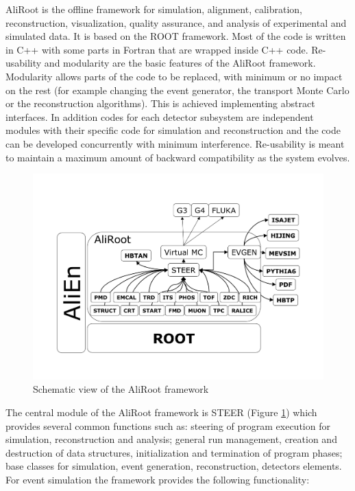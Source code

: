 AliRoot \cite{cite:ALICE} is the offline framework for simulation, alignment, calibration, reconstruction, visualization, quality assurance, and analysis of experimental and simulated data. It is based on the ROOT framework. Most of the code is written in C++ with some parts in Fortran that are wrapped inside C++ code. Re-usability and modularity are the basic features of the AliRoot framework. Modularity allows parts of the code to be replaced, with minimum or no impact on the rest (for example changing the event generator, the transport Monte Carlo or the reconstruction algorithms). This is achieved implementing abstract interfaces. In addition codes for each detector subsystem are independent modules with their specific code for simulation and reconstruction and the code can be developed concurrently with minimum interference. Re-usability is meant to maintain a maximum amount of backward compatibility as the system evolves.

\begin{figure}[htbp]
\begin{center}
\includegraphics[width=16.cm]{./Version1/FigChapter4/FigureAliRoot}
\caption{Schematic view of the AliRoot framework}
\label{fig:aliroot}
\end{center}
\end{figure}

The central module of the AliRoot framework is STEER (Figure \ref{fig:aliroot}) which provides several common functions such as: steering of program execution for simulation, reconstruction and analysis; general run management, creation and destruction of data structures, initialization and termination of program phases; base classes for simulation, event generation, reconstruction, detectors elements.
For event simulation the framework provides the following functionality:

\newpage
